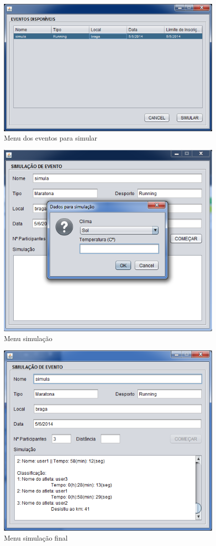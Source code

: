 \documentclass[12pt,notitlepage]{article}
\begin{document}
\begin{figure}[h]
\centering
\includegraphics[scale=1]{simularEventosAdmin.png}
\caption{Menu dos eventos para simular}
\end{figure}

\begin{figure}[h]
\centering
\includegraphics[scale=1]{simTemp.png}
\caption{Menu simulação}
\end{figure}

\begin{figure}[h]
\centering
\includegraphics[scale=1]{simulaFinal.png}
\caption{Menu simulação final}
\end{figure}
\end{document}
